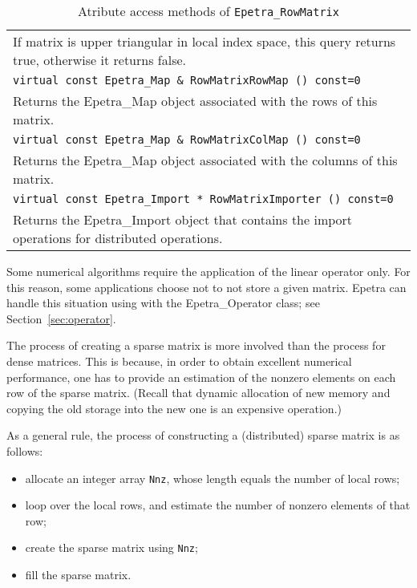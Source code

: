 \begin{table}
\begin{center}
\begin{tabular}{ | p{15cm} | }
If matrix is upper triangular in local index space, this query returns
true, otherwise it returns false. \\
\tt virtual const Epetra\_Map \& 
RowMatrixRowMap () const=0 \\
Returns the Epetra\_Map object associated with the rows of this matrix. \\
\tt virtual const Epetra\_Map \& 
RowMatrixColMap () const=0 \\
Returns the Epetra\_Map object associated with the columns of this
matrix. \\
\tt virtual const Epetra\_Import * 
RowMatrixImporter () const=0 \\
Returns the Epetra\_Import object that contains the import operations for
distributed operations. \\
\hline
\end{tabular}
\caption{Atribute access methods of {\tt Epetra\_RowMatrix}}
\label{tab:row_matrix_atr}
\end{center}
\end{table}



\begin{remark}
  Some numerical algorithms require the application of the linear
  operator only. For this reason, some applications choose not to not
  store a given matrix. Epetra can handle this situation using with the
  Epetra\_Operator class; see Section~\ref{sec:operator}.
\end{remark}

The process of creating a sparse matrix is more involved than the
process for dense matrices. This is because, in order to obtain
excellent numerical performance, one has to provide an estimation of
the nonzero elements on each row of the sparse matrix. (Recall that
dynamic allocation of new memory and copying the old storage into the
new one is an expensive operation.)

As a general rule, the process of constructing a (distributed) sparse
matrix is as follows:
\begin{itemize}
\item allocate an integer array \verb!Nnz!, whose length equals the
  number of local rows;
\item loop over the local rows, and estimate the number of nonzero
  elements of that row;
\item create the sparse matrix using \verb!Nnz!;
\item fill the sparse matrix.
\end{itemize}

